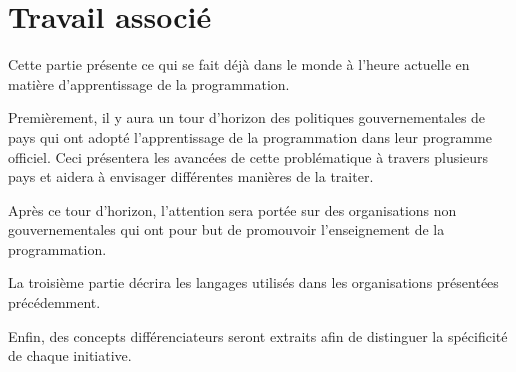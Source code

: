\chapter{Travail associé}
Cette partie présente ce qui se fait déjà dans le monde à l'heure actuelle en matière d'apprentissage de la programmation.

Premièrement, il y aura un tour d'horizon des politiques gouvernementales de pays qui ont adopté l'apprentissage de la programmation dans leur programme officiel. Ceci présentera les avancées de cette problématique à travers plusieurs pays et aidera à envisager différentes manières de la traiter. 

Après ce tour d'horizon, l'attention sera portée sur des organisations non gouvernementales qui ont pour but de promouvoir l'enseignement de la programmation. 

La troisième partie décrira les langages utilisés dans les organisations présentées précédemment. 

Enfin, des concepts différenciateurs seront extraits afin de distinguer la spécificité de chaque initiative.





